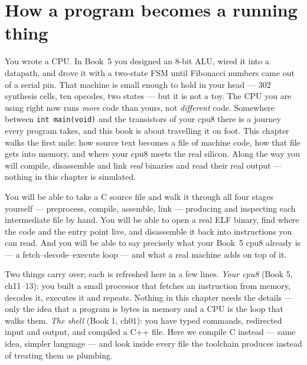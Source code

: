 \chapter{How a program becomes a running thing}
\label{ch:01}

You wrote a CPU. In Book~5 you designed an 8-bit ALU, wired it into a
datapath, and drove it with a two-state FSM until Fibonacci numbers came
out of a serial pin. That machine is small enough to hold in your head ---
302 synthesis cells, ten opcodes, two states --- but it is not a toy. The
CPU you are using right now runs \emph{more} code than yours, not
\emph{different} code. Somewhere between \texttt{int main(void)} and the
transistors of your cpu8 there is a journey every program takes, and this
book is about travelling it on foot. This chapter walks the first mile: how
source text becomes a file of machine code, how that file gets into memory,
and where your cpu8 meets the real silicon. Along the way you will
compile, disassemble and link \emph{real} binaries and read their real
output --- nothing in this chapter is simulated.

\begin{wins}
You will be able to take a C source file and walk it through all four
stages yourself --- preprocess, compile, assemble, link --- producing and
inspecting each intermediate file by hand. You will be able to open a
real ELF binary, find where the code and the entry point live, and
disassemble it back into instructions you can read. And you will be able
to say precisely what your Book~5 cpu8 already is --- a fetch--decode--execute
loop --- and what a real machine adds on top of it.
\end{wins}

\begin{rulebox}
Two things carry over; each is refreshed here in a few lines.
\emph{Your cpu8} (Book 5, ch11--13): you built a small processor that
fetches an instruction from memory, decodes it, executes it and repeats.
Nothing in this chapter needs the details --- only the idea that a
program is bytes in memory and a CPU is the loop that walks them.
\emph{The shell} (Book 1, ch01): you have typed commands, redirected
input and output, and compiled a C++ file. Here we compile C instead ---
same idea, simpler language --- and look inside every file the toolchain
produces instead of treating them as plumbing.
\end{rulebox}

%
%

